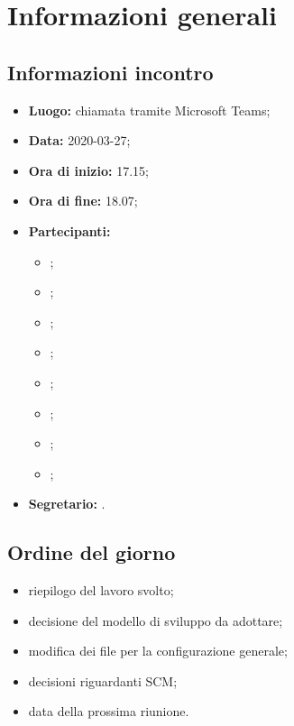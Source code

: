 \section{Informazioni generali}
\subsection{Informazioni incontro}
\begin{itemize}
	\item \textbf{Luogo:} chiamata tramite Microsoft Teams; 
	\item \textbf{Data:} 2020-03-27;
	\item \textbf{Ora di inizio:} 17.15; 
	\item \textbf{Ora di fine:} 18.07; 
	\item \textbf{Partecipanti:}
		\begin{itemize}
			\item \VB; 
			\item \LB; 
			\item \NF; 
			\item \EG; 
			\item \FJ; 
			\item \MP; 
			\item \AS; 
			\item \AZ; 
		\end{itemize}
	\item \textbf{Segretario:} \NF. 
\end{itemize}

\subsection{Ordine del giorno}
\begin{itemize}
	\item riepilogo del lavoro svolto;
	\item decisione del modello di sviluppo da adottare;
	\item modifica dei file per la configurazione generale;
	\item decisioni riguardanti SCM;
	\item data della prossima riunione.
\end{itemize}
